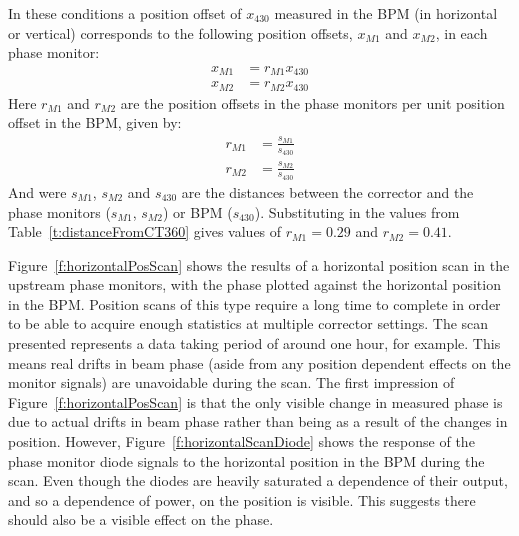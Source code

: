 In these conditions a position offset of \(x_{430}\) measured in the BPM (in horizontal or vertical) corresponds to the following position offsets, \(x_{M1}\) and \(x_{M2}\), in each phase monitor:
\begin{align}
x_{M1} &= r_{M1}x_{430} \\
x_{M2} &= r_{M2}x_{430}
\end{align}
Here \(r_{M1}\) and \(r_{M2}\) are the position offsets in the phase monitors per unit position offset in the BPM, given by:
\begin{align}
r_{M1} &= \frac{s_{M1}}{s_{430}} \\
r_{M2} &= \frac{s_{M2}}{s_{430}}
\end{align}
And were \(s_{M1}\), \(s_{M2}\) and \(s_{430}\) are the distances between the corrector and the phase monitors (\(s_{M1}\), \(s_{M2}\)) or BPM (\(s_{430}\)). Substituting in the values from Table~\ref{t:distanceFromCT360} gives values of \(r_{M1} = 0.29\) and \(r_{M2} = 0.41\).

Figure~\ref{f:horizontalPosScan} shows the results of a horizontal position scan in the upstream phase monitors, with the phase plotted against the horizontal position in the BPM. Position scans of this type require a long time to complete in order to be able to acquire enough statistics at multiple corrector settings. The scan presented represents a data taking period of around one hour, for example. This means real drifts in beam phase (aside from any position dependent effects on the monitor signals) are unavoidable during the scan. The first impression of Figure~\ref{f:horizontalPosScan} is that the only visible change in measured phase is due to actual drifts in beam phase rather than being as a result of the changes in position. However, Figure~\ref{f:horizontalScanDiode} shows the response of the phase monitor diode signals to the horizontal position in the BPM during the scan. Even though the diodes are heavily saturated a dependence of their output, and so a dependence of power, on the position is visible. This suggests there should also be a visible effect on the phase.

